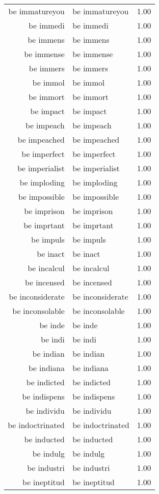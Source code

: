 \begin{table}[ht]
\begin{tabular}{rlr}
  be immatureyou & be immatureyou & 1.00 \\ 
  be immedi & be immedi & 1.00 \\ 
  be immens & be immens & 1.00 \\ 
  be immense & be immense & 1.00 \\ 
  be immers & be immers & 1.00 \\ 
  be immol & be immol & 1.00 \\ 
  be immort & be immort & 1.00 \\ 
  be impact & be impact & 1.00 \\ 
  be impeach & be impeach & 1.00 \\ 
  be impeached & be impeached & 1.00 \\ 
  be imperfect & be imperfect & 1.00 \\ 
  be imperialist & be imperialist & 1.00 \\ 
  be imploding & be imploding & 1.00 \\ 
  be impossible & be impossible & 1.00 \\ 
  be imprison & be imprison & 1.00 \\ 
  be imprtant & be imprtant & 1.00 \\ 
  be impuls & be impuls & 1.00 \\ 
  be inact & be inact & 1.00 \\ 
  be incalcul & be incalcul & 1.00 \\ 
  be incensed & be incensed & 1.00 \\ 
  be inconsiderate & be inconsiderate & 1.00 \\ 
  be inconsolable & be inconsolable & 1.00 \\ 
  be inde & be inde & 1.00 \\ 
  be indi & be indi & 1.00 \\ 
  be indian & be indian & 1.00 \\ 
  be indiana & be indiana & 1.00 \\ 
  be indicted & be indicted & 1.00 \\ 
  be indispens & be indispens & 1.00 \\ 
  be individu & be individu & 1.00 \\ 
  be indoctrinated & be indoctrinated & 1.00 \\ 
  be inducted & be inducted & 1.00 \\ 
  be indulg & be indulg & 1.00 \\ 
  be industri & be industri & 1.00 \\ 
  be ineptitud & be ineptitud & 1.00 \\ 

\end{tabular}
\end{table}

